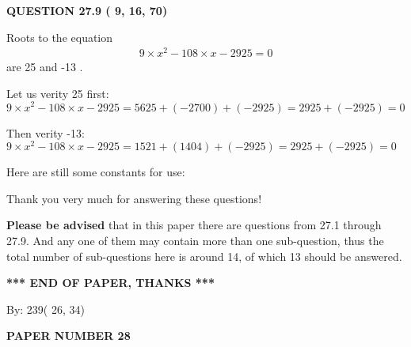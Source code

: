 \documentclass[12pt]{article}
\begin{document}
 
 
  
\vspace{0.2in}
  
{\textbf{\Large{QUESTION
27.9 
 (          9,         16,         70)
}}}
  
  


 
 

Roots to the equation
\begin{eqnarray*}
9 \times x^2  %
-108
                 \times x    %
-2925 =0
\end{eqnarray*}
are  %
25 and  %
-13 .
 
Let us verity  %
25 first:
$  %
9 \times x^2  %
-108
                 \times x    %
-2925
  = %
5625+( %
-2700)+( %
-2925)
  = %
2925+( %
-2925)
  = %
0
$
 
Then verity  %
-13:
$  %
9 \times x^2  %
-108
                 \times x    %
-2925
  = %
1521+( %
1404)+( %
-2925)
  = %
2925+( %
-2925)
  = %
0
$
 
 
 
   
   
 \vspace{0.2in}
Here are still some constants for use:
 
 
 
 
Thank you very much for answering these questions!
 
{\textbf{\large{Please be advised}}} that in this paper there are questions from
27.1 through
27.9.
And any one of them may contain more than one sub-question, thus the total number
of sub-questions here is around 14, of which
13 should be answered.
 
   
   
   
   
\vspace{1.0in} 
{\textbf{\large{ *** END OF PAPER, THANKS *** }}} 
   
   
\hspace{1.0in} By: 
         239(         26,          34)
   
   
   
   
\newpage 
\setcounter{page}{ 
    28001 } 
   
   
   
   
 {\textbf{ \Large{ PAPER NUMBER          28 }}}
   
   
\vspace{0.2in}
   
   
   
\end{document}
